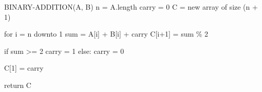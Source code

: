 \documentclass[
]{article}
\newenvironment{Shaded}{}{}
\newcommand{\NormalTok}[1]{#1}
\begin{document}
\begin{Shaded}
\begin{Highlighting}[]
\NormalTok{BINARY{-}ADDITION(A, B)}
\NormalTok{    n = A.length}
\NormalTok{    carry = 0}
\NormalTok{    C = new array of size (n + 1)}
    
\NormalTok{    for i = n downto 1 }
\NormalTok{        sum = A[i] + B[i] + carry}
\NormalTok{        C[i+1] = sum \% 2}
        
\NormalTok{        if sum \textgreater{}= 2}
\NormalTok{            carry = 1}
\NormalTok{        else:}
\NormalTok{            carry = 0}
    
\NormalTok{    C[1] = carry  }
    
\NormalTok{    return C}
\end{Highlighting}
\end{Shaded}
\end{document}
